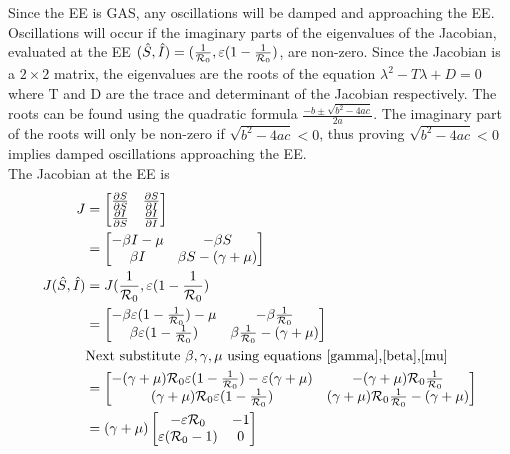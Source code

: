 Since the EE is GAS, any oscillations will be damped and approaching the EE.
Oscillations will occur if the imaginary parts of the eigenvalues of the Jacobian, evaluated at the EE $(\hat{S},\hat{I}) = (\frac{1}{\mathcal R_0},\varepsilon(1-\frac{1}{\mathcal R_0})$, are non-zero.
Since the Jacobian is a $2\times 2$ matrix, the eigenvalues are the roots of the equation $\lambda^2 - T\lambda + D = 0$ where T and D are the trace and determinant of the Jacobian respectively.
The roots can be found using the quadratic formula $\frac{-b \pm \sqrt{b^2-4ac}}{2a}$.
The imaginary part of the roots will only be non-zero if $\sqrt{b^2-4ac} < 0$, thus proving $\sqrt{b^2-4ac} < 0$ implies damped oscillations approaching the EE.\\
The Jacobian at the EE is
\begin{align}
J &=
\begin{bmatrix}
    \frac{\partial S}{\partial S} & \frac{\partial S}{\partial I}\\
    \frac{\partial I}{\partial S} & \frac{\partial I}{\partial I}
\end{bmatrix}\\
&=
\begin{bmatrix}
    -\beta I - \mu & -\beta S\\
    \beta I &\beta S - (\gamma+\mu)
\end{bmatrix}\\
J(\hat{S},\hat{I}) &= J(\frac{1}{\mathcal R_0},\varepsilon(1-\frac{1}{\mathcal R_0})\\
&=
\begin{bmatrix}
    -\beta \varepsilon(1-\frac{1}{\mathcal R_0}) - \mu & -\beta \frac{1}{\mathcal R_0}\\
    \beta \varepsilon(1-\frac{1}{\mathcal R_0}) &\beta \frac{1}{\mathcal R_0} - (\gamma+\mu)
\end{bmatrix}\\
& \textrm{Next substitute $\beta, \gamma, \mu$ using equations \ref{gamma},\ref{beta},\ref{mu}}\nonumber\\
&=
\begin{bmatrix}
    -(\gamma+\mu){\mathcal R_0} \varepsilon(1-\frac{1}{\mathcal R_0}) - \varepsilon(\gamma+\mu) & -(\gamma+\mu){\mathcal R_0} \frac{1}{\mathcal R_0}\\
    (\gamma+\mu){\mathcal R_0} \varepsilon(1-\frac{1}{\mathcal R_0}) &(\gamma+\mu){\mathcal R_0} \frac{1}{\mathcal R_0} - (\gamma+\mu)
\end{bmatrix}\\
&= (\gamma+\mu)
\begin{bmatrix}
    -\varepsilon {\mathcal R_0}  & -1\\
    \varepsilon({\mathcal R_0}-1) & 0
\end{bmatrix}
\end{align}
